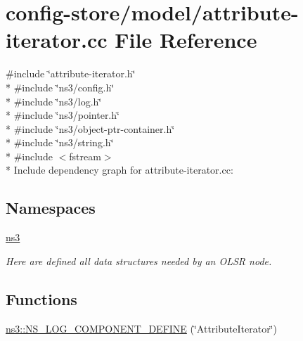 \hypertarget{attribute-iterator_8cc}{}\section{config-\/store/model/attribute-\/iterator.cc File Reference}
\label{attribute-iterator_8cc}
{\ttfamily \#include \char`\"{}attribute-\/iterator.\+h\char`\"{}}\\*
{\ttfamily \#include \char`\"{}ns3/config.\+h\char`\"{}}\\*
{\ttfamily \#include \char`\"{}ns3/log.\+h\char`\"{}}\\*
{\ttfamily \#include \char`\"{}ns3/pointer.\+h\char`\"{}}\\*
{\ttfamily \#include \char`\"{}ns3/object-\/ptr-\/container.\+h\char`\"{}}\\*
{\ttfamily \#include \char`\"{}ns3/string.\+h\char`\"{}}\\*
{\ttfamily \#include $<$fstream$>$}\\*
Include dependency graph for attribute-\/iterator.cc\+:
\subsection*{Namespaces}
\begin{DoxyCompactItemize}
\item 
 \hyperlink{namespacens3}{ns3}
\begin{DoxyCompactList}\small\item\em Here are defined all data structures needed by an O\+L\+SR node. \end{DoxyCompactList}\end{DoxyCompactItemize}
\subsection*{Functions}
\begin{DoxyCompactItemize}
\item 
\hyperlink{namespacens3_aa5d7d5882e51ac7a36a57672328c42a3}{ns3\+::\+N\+S\+\_\+\+L\+O\+G\+\_\+\+C\+O\+M\+P\+O\+N\+E\+N\+T\+\_\+\+D\+E\+F\+I\+NE} (\char`\"{}Attribute\+Iterator\char`\"{})
\end{DoxyCompactItemize}
